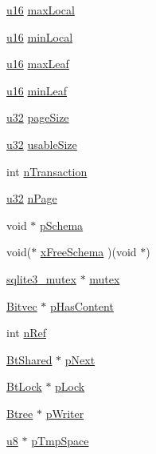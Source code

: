 \begin{DoxyCompactItemize}
\hyperlink{sqlite3_8c_a20f2299e322dcbde37cb07b16910b843}{u16} \hyperlink{struct_bt_shared_ae520370dc0940464a186684b0a9b5113}{max\+Local}
\item 
\hyperlink{sqlite3_8c_a20f2299e322dcbde37cb07b16910b843}{u16} \hyperlink{struct_bt_shared_acae49d06fe5c209d808832232cee4a00}{min\+Local}
\item 
\hyperlink{sqlite3_8c_a20f2299e322dcbde37cb07b16910b843}{u16} \hyperlink{struct_bt_shared_aaeea9c389ead7c7a046429260b2dcdea}{max\+Leaf}
\item 
\hyperlink{sqlite3_8c_a20f2299e322dcbde37cb07b16910b843}{u16} \hyperlink{struct_bt_shared_aaab9580fd37da2518624d11a6b0fa3dd}{min\+Leaf}
\item 
\hyperlink{sqlite3_8c_a03ad5adfaeb9b7640dde78a0cc390319}{u32} \hyperlink{struct_bt_shared_a1706c74ca68893675ccff5e7b77c2298}{page\+Size}
\item 
\hyperlink{sqlite3_8c_a03ad5adfaeb9b7640dde78a0cc390319}{u32} \hyperlink{struct_bt_shared_a70b6ce95d7e84acc2a6977de8467cc9d}{usable\+Size}
\item 
int \hyperlink{struct_bt_shared_aa2fdd4cb1e67f982a5db1c38ea1ee06f}{n\+Transaction}
\item 
\hyperlink{sqlite3_8c_a03ad5adfaeb9b7640dde78a0cc390319}{u32} \hyperlink{struct_bt_shared_a6b939842a27dd6c712b8a6f878bd0e89}{n\+Page}
\item 
void $\ast$ \hyperlink{struct_bt_shared_a9196b055b4bfcce3685531186d868627}{p\+Schema}
\item 
void($\ast$ \hyperlink{struct_bt_shared_abd937f71f6aed2873899ffb6ed52e459}{x\+Free\+Schema} )(void $\ast$)
\item 
\hyperlink{structsqlite3__mutex}{sqlite3\+\_\+mutex} $\ast$ \hyperlink{struct_bt_shared_a7bcdded0e06fa908fe1a6df19c3dda21}{mutex}
\item 
\hyperlink{struct_bitvec}{Bitvec} $\ast$ \hyperlink{struct_bt_shared_a7c495df66ccfb0ad05cca7513fbbb930}{p\+Has\+Content}
\item 
int \hyperlink{struct_bt_shared_a3c459f9ae278c22b72583c55ca01acb7}{n\+Ref}
\item 
\hyperlink{struct_bt_shared}{Bt\+Shared} $\ast$ \hyperlink{struct_bt_shared_a546c1c14e62f140cc3503f3aa893d971}{p\+Next}
\item 
\hyperlink{struct_bt_lock}{Bt\+Lock} $\ast$ \hyperlink{struct_bt_shared_a403bf6a43c2fd8ed0607553518004c91}{p\+Lock}
\item 
\hyperlink{struct_btree}{Btree} $\ast$ \hyperlink{struct_bt_shared_a0bc58cbb58aebf87675023a1af689a2b}{p\+Writer}
\item 
\hyperlink{sqlite3_8c_a74a0f6424ae628af25f23f0a35f6ead3}{u8} $\ast$ \hyperlink{struct_bt_shared_a89d36b1f2b625622fa2b7e49c578bdf2}{p\+Tmp\+Space}
\end{DoxyCompactItemize}


